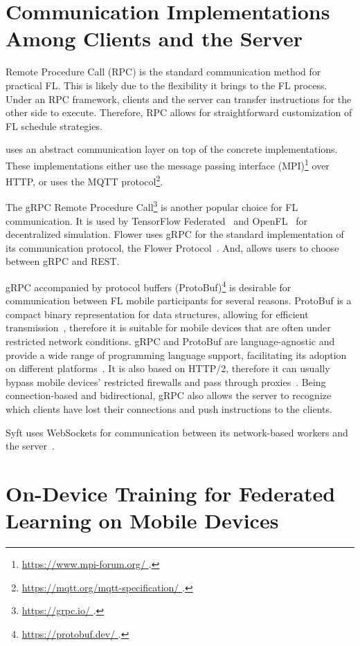 \documentclass[conference]{IEEEtran}
\begin{document}
\section{Communication Implementations Among Clients and the Server}

Remote Procedure Call (RPC) is the standard communication method for
practical FL.
This is likely due to the flexibility it brings to the FL process.
Under an RPC framework,
clients and the server can transfer instructions for the other side to execute.
Therefore, RPC allows for straightforward customization of
FL schedule strategies.

\FedML{} uses an abstract communication layer on top of
the concrete implementations.
These implementations either use the message passing interface
(MPI)\footnote{\url{
    https://www.mpi-forum.org/
}.} over HTTP,
or uses the MQTT protocol\footnote{\url{
    https://mqtt.org/mqtt-specification/
}.}.

The gRPC Remote Procedure Call\footnote{\url{
    https://grpc.io/
}.} is another popular choice for FL communication.
It is used by TensorFlow Federated~\cite{tff} and
OpenFL~\cite{patrick2022openfl} for decentralized simulation.
Flower uses gRPC for the standard implementation of
its communication protocol, the Flower Protocol~\cite{beutel2020flower}.
And, \Florida{} allows users to choose between gRPC and REST.

gRPC accompanied by protocol buffers (ProtoBuf)\footnote{\url{
    https://protobuf.dev/
}.} is desirable for communication between FL mobile participants for
several reasons.
ProtoBuf is a compact binary representation for data structures,
allowing for efficient transmission~\cite{popic2016performance},
therefore it is suitable for mobile devices that
are often under restricted network conditions.
gRPC and ProtoBuf are language-agnostic and
provide a wide range of programming language support,
facilitating its adoption on different platforms~\cite{araujo2020performance}.
It is also based on HTTP/2,
therefore it can usually bypass mobile devices' restricted firewalls and
pass through proxies~\cite{araujo2020performance}.
Being connection-based and bidirectional,
gRPC also allows the server to recognize
which clients have lost their connections and
push instructions to the clients.

Syft uses WebSockets for communication between its network-based workers and
the server~\cite{Ziller2021}.

\section{On-Device Training for Federated Learning on Mobile Devices}
\end{document}
